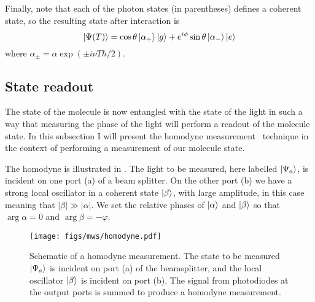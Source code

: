 %
Finally, note that each of the photon states (in parentheses) defines a
coherent state, so the resulting state after interaction is
%
\begin{equation}
  \ket{\Psi(T)} = \cos\theta\ket{\alpha_+}\ket{g} +
  e^{i\phi}\sin\theta\ket{\alpha_-}\ket{e}
\end{equation}
%
where $\alpha_\pm = \alpha \exp(\pm i \nu T \hbar/2)$.

\subsection{State readout}

The state of the molecule is now entangled with the state of the light in such
a way that measuring the phase of the light will perform a readout of the
molecule state. In this subsection I will present the homodyne
measurement~\cite{agarwal2012} technique in the context of performing a
measurement of our molecule state.

The homodyne  is illustrated in . The
light to be measured, here labelled $\ket{\Psi_a}$, is incident on one port (a)
of a beam splitter. On the other port (b) we have a strong local oscillator in
a coherent state $\ket{\beta}$, with large amplitude, in
this case meaning that $|\beta| \gg |\alpha|$. We set the relative phases of
$\ket{\alpha}$ and $\ket{\beta}$ so that $\arg{\alpha}=0$ and
$\arg{\beta}=-\varphi$.

\begin{figure}
  \centering
  \texttt{[image: figs/mws/homodyne.pdf]}
  \caption{Schematic of a homodyne measurement. The state to be measured
    $\ket{\Psi_a}$ is incident on port (a) of the beamsplitter, and the local
    oscillator $\ket{\beta}$ is incident on port (b). The signal from
    photodiodes at the output ports is summed to produce a homodyne
    measurement.
  }
  \label{mws:fig:homodyne}
\end{figure}

